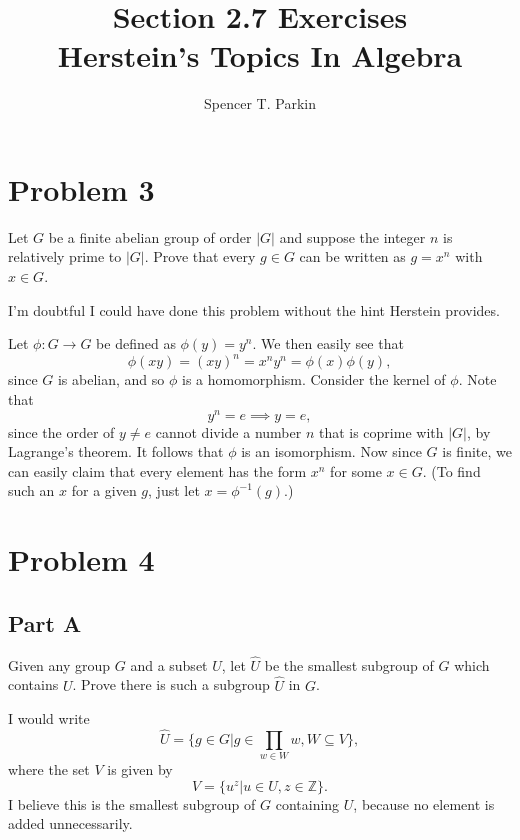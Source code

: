 \documentclass[12pt]{article}
\title{Section 2.7 Exercises\\Herstein's Topics In Algebra}
\author{Spencer T. Parkin}
\newcommand{\Z}{\mathbb{Z}}
\begin{document}
\maketitle

\section*{Problem 3}

Let $G$ be a finite abelian group of order $|G|$ and suppose the integer
$n$ is relatively prime to $|G|$.  Prove that every $g\in G$ can be written as
$g=x^n$ with $x\in G$.

I'm doubtful I could have done this problem without the hint Herstein provides.

Let $\phi:G\to G$ be defined as $\phi(y)=y^n$.  We then easily see that
\begin{equation*}
\phi(xy)=(xy)^n=x^ny^n=\phi(x)\phi(y),
\end{equation*}
since $G$ is abelian, and so $\phi$ is a homomorphism.
Consider the kernel of $\phi$.  Note that
\begin{equation*}
y^n=e\implies y=e,
\end{equation*}
since the order of $y\neq e$ cannot divide a number $n$ that is coprime with $|G|$,
by Lagrange's theorem.  It follows that $\phi$ is an isomorphism.
Now since $G$ is finite, we can easily claim that every element has
the form $x^n$ for some $x\in G$.  (To find such an $x$ for a given $g$,
just let $x=\phi^{-1}(g)$.)

\section*{Problem 4}

\subsection*{Part A}

Given any group $G$ and a subset $U$, let $\hat{U}$ be the smallest subgroup
of $G$ which contains $U$.  Prove there is such a subgroup $\hat{U}$ in $G$.

I would write
\begin{equation*}
\hat{U}=\{g\in G|g\in\prod_{w\in W}w,W\subseteq V\},
\end{equation*}
where the set $V$ is given by
\begin{equation*}
V=\{u^z|u\in U,z\in\Z\}.
\end{equation*}
I believe this is the smallest subgroup of $G$ containing $U$, because
no element is added unnecessarily.
\end{document}
